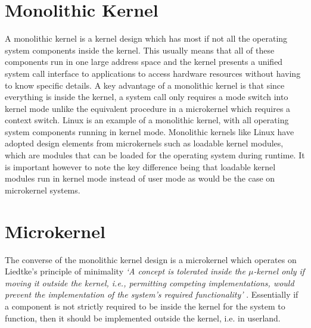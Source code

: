 \documentclass[../thesis.tex]{subfiles}
\begin{document}
\section{Monolithic Kernel}
A monolithic kernel is a kernel design which has most if not all the operating system components inside the kernel. This usually means that all of these components run in one large address space and the kernel presents a unified system call interface to applications to access hardware resources without having to know specific details. A key advantage of a monolithic kernel is that since everything is inside the kernel, a system call only requires a mode switch into kernel mode unlike the equivalent procedure in a microkernel which requires a context switch. Linux is an example of a monolithic kernel, with all operating system components running in kernel mode. Monolithic kernels like Linux have adopted design elements from microkernels such as loadable kernel modules, which are modules that can be loaded for the operating system during runtime. It is important however to note the key difference being that loadable kernel modules run in kernel mode instead of user mode as would be the case on microkernel systems. 

\section{Microkernel}
The converse of the monolithic kernel design is a microkernel which operates on Liedtke's principle of minimality \textit{`A concept is tolerated inside the $\mu$-kernel only if moving it outside the kernel, i.e., permitting competing implementations, would prevent the implementation of the system's required functionality'} \citep{Liedtke_95}. Essentially if a component is not strictly required to be inside the kernel for the system to function, then it should be implemented outside the kernel, i.e. in userland. 
\end{document}
